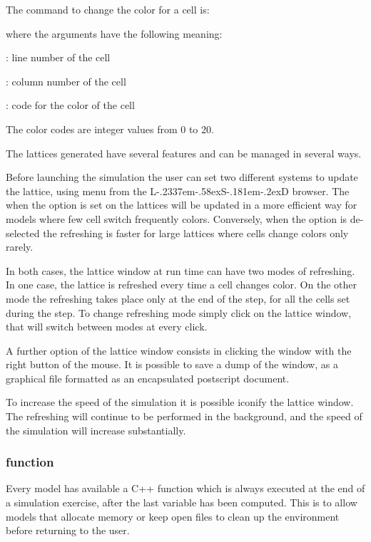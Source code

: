 \documentclass [11pt,a4paper] {book}
\def\LsD{{L\kern-.2337em\lower-.58ex\hbox{S}\kern-.181em\lower-.2ex\hbox{D}}\xspace}
\begin{document}
The command to change the color for a cell is:


where the arguments have the following meaning:

\begin{list}{-}{\itemsep -0.2cm}

\item {}: line number of the cell

\item {}: column number of the cell

\item {}: code for the color of the cell

\end{list}


The color codes are integer values from 0 to 20. 

The lattices generated have several features and can be managed in several ways.

Before launching the simulation the user can set two different systems to update the lattice, using menu  from the \LsD browser. The when the option is set on the lattices will be updated in a more efficient way for models where few cell switch frequently colors. Conversely, when the option is de-selected the refreshing is faster for large lattices where cells change colors only rarely.

In both cases, the lattice window at run time can have two modes of refreshing. In one case, the lattice is refreshed every time a cell changes color. On the other mode the refreshing takes place only at the end of the step, for all the cells set during the step. To change refreshing mode simply click on the lattice window, that will switch between modes at every click.

A further option of the lattice window consists in clicking the window with the right button of the mouse. It is possible to save a dump of the window, as a graphical file formatted as an encapsulated postscript document.

To increase the speed of the simulation it is possible iconify the lattice window. The refreshing will continue to be performed in the background, and the speed of the simulation will increase substantially.



\subsubsection{ function}
Every model has available a C++ function which is always executed at the end of a
simulation exercise, after the last variable has been computed. This is to allow models
that allocate memory or keep open files to clean up the environment before returning to
the user.
\end{document}
